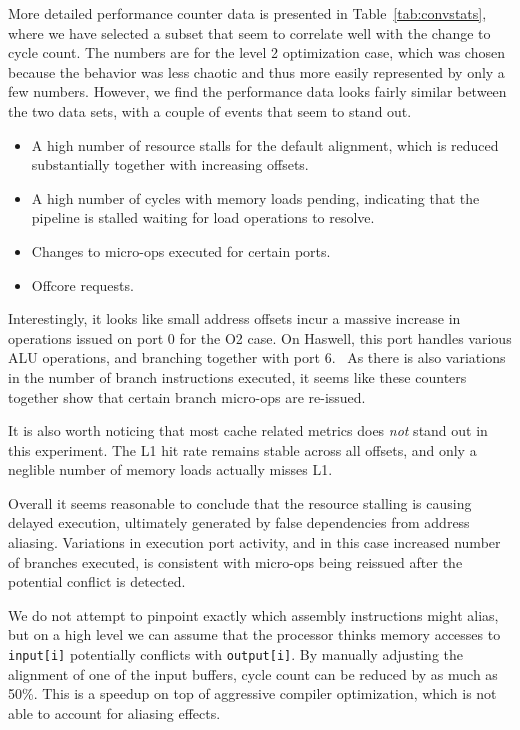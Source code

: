 \documentclass[a4paper,10pt,twocolumn,twoside]{article}
\begin{document}
{More detailed performance counter data is presented in Table~\ref{tab:convstats}, where we have selected a subset that seem to correlate well with the change to cycle count.
The numbers are for the level 2 optimization case, which was chosen because the behavior was less chaotic and thus more easily represented by only a few numbers.
However, we find the performance data looks fairly similar between the two data sets, with a couple of events that seem to stand out.
\begin{itemize}
    \item A high number of resource stalls for the default alignment, which is reduced substantially together with increasing offsets. 
    \item A high number of cycles with memory loads pending, indicating that the pipeline is stalled waiting for load operations to resolve.
    \item Changes to micro-ops executed for certain ports.
    \item Offcore requests. %
\end{itemize} 
Interestingly, it looks like small address offsets incur a massive increase in operations issued on port 0 for the O2 case. 
On Haswell, this port handles various ALU operations, and branching together with port 6.~\cite[Figure 2.1]{OptimizationManual}
As there is also variations in the number of branch instructions executed, it seems like these counters together show that certain branch micro-ops are re-issued.

It is also worth noticing that most cache related metrics does \emph{not} stand out in this experiment.
The L1 hit rate remains stable across all offsets, and only a neglible number of memory loads actually misses L1.

Overall it seems reasonable to conclude that the resource stalling is causing delayed execution, ultimately generated by false dependencies from address aliasing.
Variations in execution port activity, and in this case increased number of branches executed, is consistent with micro-ops being reissued after the potential conflict is detected.

We do not attempt to pinpoint exactly which assembly instructions might alias, but on a high level we can assume that the processor thinks memory accesses to \texttt{input[i]} potentially conflicts with \texttt{output[i]}.
By manually adjusting the alignment of one of the input buffers, cycle count can be reduced by as much as 50\%.
This is a speedup on top of aggressive compiler optimization, which is not able to account for aliasing effects.


}
\end{document}
